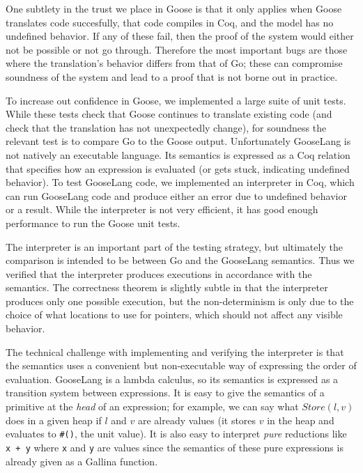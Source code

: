 One subtlety in the trust we place in Goose is that it only applies when
Goose translates code succesfully, that code compiles in Coq, and the
model has no undefined behavior. If any of these fail, then the proof of
the system would either not be possible or not go through. Therefore the
most important bugs are those where the translation's behavior differs
from that of Go; these can compromise soundness of the system and lead
to a proof that is not borne out in practice.

To increase out confidence in Goose, we implemented a large suite of
unit tests. While these tests check that Goose continues to translate
existing code (and check that the translation has not unexpectedly
change), for soundness the relevant test is to compare Go to the Goose
output. Unfortunately GooseLang is not natively an executable language.
Its semantics is expressed as a Coq relation that specifies how an
expression is evaluated (or gets stuck, indicating undefined behavior).
To test GooseLang code, we implemented an interpreter in Coq, which can
run GooseLang code and produce either an error due to undefined behavior
or a result. While the interpreter is not very efficient, it has good
enough performance to run the Goose unit tests.

The interpreter is an important part of the testing strategy, but
ultimately the comparison is intended to be between Go and the GooseLang
semantics. Thus we verified that the interpreter produces executions in
accordance with the semantics. The correctness theorem is slightly
subtle in that the interpreter produces only one possible execution, but
the non-determinism is only due to the choice of what locations to use
for pointers, which should not affect any visible behavior.

The technical challenge with implementing and verifying the interpreter
is that the semantics uses a convenient but non-executable way of
expressing the order of evaluation. GooseLang is a lambda calculus, so
its semantics is expressed as a transition system between expressions.
It is easy to give the semantics of a primitive at the \emph{head} of an
expression; for example, we can say what \(Store(l, v)\) does in a given
heap if \(l\) and \(v\) are already values (it stores \(v\) in the heap
and evaluates to \texttt{\#()}, the unit value). It is also easy to
interpret \emph{pure} reductions like \texttt{x\ +\ y} where \texttt{x}
and \texttt{y} are values since the semantics of these pure expressions
is already given as a Gallina function.


